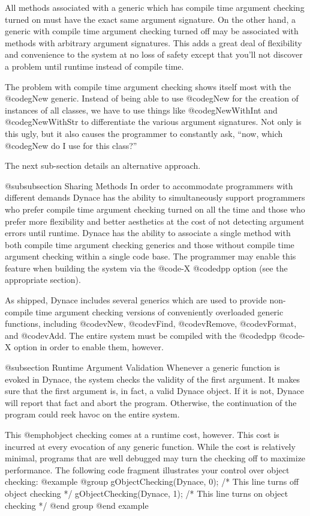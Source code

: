 All methods associated with a generic which has compile time argument
checking turned on must have the exact same argument signature.  On the
other hand, a generic with compile time argument checking turned off
may be associated with methods with arbitrary argument signatures.
This adds a great deal of flexibility and convenience to the system
at no loss of safety except that you'll not discover a problem
until runtime instead of compile time.


The problem with compile time argument checking shows itself most with
the @code{gNew} generic.  Instead of being able to use @code{gNew}
for the creation of instances of all classes, we have to use things
like @code{gNewWithInt} and @code{gNewWithStr} to differentiate
the various argument signatures.  Not only is this ugly, but it also
causes the programmer to constantly ask, ``now, which @code{gNew} do
I use for this class?''

The next sub-section details an alternative approach.

@subsubsection Sharing Methods
In order to accommodate programmers with different demands Dynace has the
ability to simultaneously support programmers who prefer compile time
argument checking turned on all the time and those who prefer more
flexibility and better aesthetics at the cost of not detecting argument 
errors until runtime.  Dynace has the ability to associate a single
method with both compile time argument checking generics and those
without compile time argument checking within a single code base.  The
programmer may enable this feature when building the system via the
@code{-X} @code{dpp} option (see the appropriate section).

As shipped, Dynace includes several generics which are used to provide
non-compile time argument checking versions of conveniently overloaded
generic functions, including @code{vNew}, @code{vFind}, @code{vRemove},
@code{vFormat}, and @code{vAdd}.  The entire system must be compiled with
the @code{dpp} @code{-X} option in order to enable them, however.

@subsection Runtime Argument Validation
Whenever a generic function is evoked in Dynace, the system checks the
validity of the first argument.  It makes sure that the first argument
is, in fact, a valid Dynace object.  If it is not, Dynace will report that fact
and abort the program.  Otherwise, the continuation of the program could reek
havoc on the entire system.

This @emph{object checking} comes at a runtime cost, however.  This cost
is incurred at every evocation of any generic function.  While the cost
is relatively minimal, programs that are well debugged may turn the
checking off to maximize performance.  The following code fragment
illustrates your control over object checking:
@example
@group
gObjectChecking(Dynace, 0);  /* This line turns off object checking */
gObjectChecking(Dynace, 1);  /* This line turns on  object checking */
@end group
@end example

